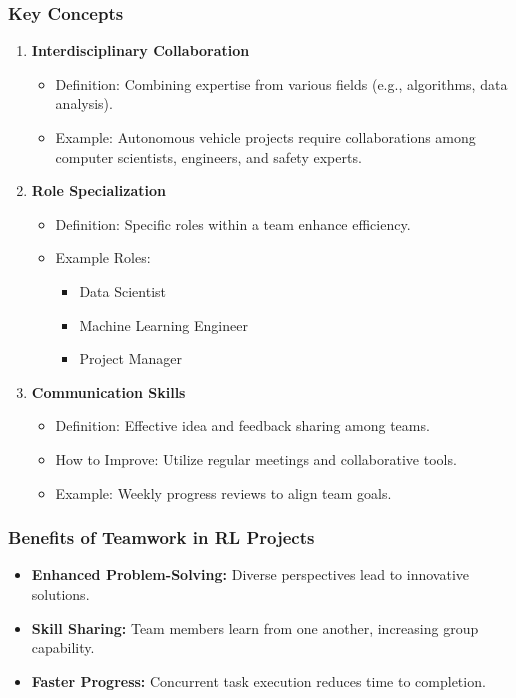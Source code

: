 \documentclass[aspectratio=169]{beamer}
\begin{document}
\begin{frame}[fragile]
    \frametitle{Key Concepts}
    \begin{enumerate}
        \item \textbf{Interdisciplinary Collaboration}
            \begin{itemize}
                \item Definition: Combining expertise from various fields (e.g., algorithms, data analysis).
                \item Example: Autonomous vehicle projects require collaborations among computer scientists, engineers, and safety experts.
            \end{itemize}

        \item \textbf{Role Specialization}
            \begin{itemize}
                \item Definition: Specific roles within a team enhance efficiency.
                \item Example Roles: 
                    \begin{itemize}
                        \item Data Scientist
                        \item Machine Learning Engineer
                        \item Project Manager
                    \end{itemize}
            \end{itemize}

        \item \textbf{Communication Skills}
            \begin{itemize}
                \item Definition: Effective idea and feedback sharing among teams.
                \item How to Improve: Utilize regular meetings and collaborative tools.
                \item Example: Weekly progress reviews to align team goals.
            \end{itemize}
    \end{enumerate}
\end{frame}

\begin{frame}[fragile]
    \frametitle{Benefits of Teamwork in RL Projects}
    \begin{itemize}
        \item \textbf{Enhanced Problem-Solving:} Diverse perspectives lead to innovative solutions.
        \item \textbf{Skill Sharing:} Team members learn from one another, increasing group capability.
        \item \textbf{Faster Progress:} Concurrent task execution reduces time to completion.
    \end{itemize}
\end{frame}
\end{document}
